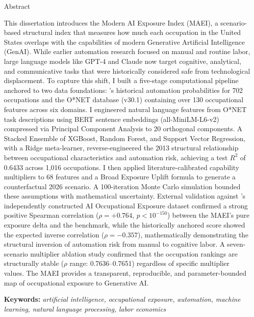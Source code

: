 \begin{Chapter}{Abstract}

This dissertation introduces the Modern AI Exposure Index (MAEI), a scenario-based structural index that measures how much each occupation in the United States overlaps with the capabilities of modern Generative Artificial Intelligence (GenAI). While earlier automation research focused on manual and routine labor, large language models like GPT-4 and Claude now target cognitive, analytical, and communicative tasks that were historically considered safe from technological displacement. To capture this shift, I built a five-stage computational pipeline anchored to two data foundations: \citet{Frey_Osborne_2017}'s historical automation probabilities for 702 occupations and the O*NET database (v30.1) containing over 130 occupational features across six domains. I engineered natural language features from O*NET task descriptions using BERT sentence embeddings (all-MiniLM-L6-v2) compressed via Principal Component Analysis to 20 orthogonal components. A Stacked Ensemble of XGBoost, Random Forest, and Support Vector Regression, with a Ridge meta-learner, reverse-engineered the 2013 structural relationship between occupational characteristics and automation risk, achieving a test $R^2$ of 0.6433 across 1,016 occupations. I then applied literature-calibrated capability multipliers to 68 features and a Broad Exposure Uplift formula to generate a counterfactual 2026 scenario. A 100-iteration Monte Carlo simulation bounded these assumptions with mathematical uncertainty. External validation against \citet{Felten_Raj_Seamans_2021}'s independently constructed AI Occupational Exposure dataset confirmed a strong positive Spearman correlation ($\rho = +0.764$, $p < 10^{-150}$) between the MAEI's pure exposure delta and the benchmark, while the historically anchored score showed the expected inverse correlation ($\rho = -0.357$), mathematically demonstrating the structural inversion of automation risk from manual to cognitive labor. A seven-scenario multiplier ablation study confirmed that the occupation rankings are structurally stable ($\rho$ range: 0.7636--0.7651) regardless of specific multiplier values. The MAEI provides a transparent, reproducible, and parameter-bounded map of occupational exposure to Generative AI.

\vspace{1em}
\noindent\textbf{Keywords:} \textit{artificial intelligence, occupational exposure, automation, machine learning, natural language processing, labor economics}

\end{Chapter}
